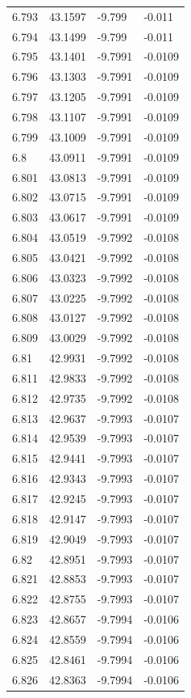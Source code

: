 \begin{tabular}{llll}
6.793 & 43.1597 & -9.799 & -0.011 \\
6.794 & 43.1499 & -9.799 & -0.011 \\
6.795 & 43.1401 & -9.7991 & -0.0109 \\
6.796 & 43.1303 & -9.7991 & -0.0109 \\
6.797 & 43.1205 & -9.7991 & -0.0109 \\
6.798 & 43.1107 & -9.7991 & -0.0109 \\
6.799 & 43.1009 & -9.7991 & -0.0109 \\
6.8 & 43.0911 & -9.7991 & -0.0109 \\
6.801 & 43.0813 & -9.7991 & -0.0109 \\
6.802 & 43.0715 & -9.7991 & -0.0109 \\
6.803 & 43.0617 & -9.7991 & -0.0109 \\
6.804 & 43.0519 & -9.7992 & -0.0108 \\
6.805 & 43.0421 & -9.7992 & -0.0108 \\
6.806 & 43.0323 & -9.7992 & -0.0108 \\
6.807 & 43.0225 & -9.7992 & -0.0108 \\
6.808 & 43.0127 & -9.7992 & -0.0108 \\
6.809 & 43.0029 & -9.7992 & -0.0108 \\
6.81 & 42.9931 & -9.7992 & -0.0108 \\
6.811 & 42.9833 & -9.7992 & -0.0108 \\
6.812 & 42.9735 & -9.7992 & -0.0108 \\
6.813 & 42.9637 & -9.7993 & -0.0107 \\
6.814 & 42.9539 & -9.7993 & -0.0107 \\
6.815 & 42.9441 & -9.7993 & -0.0107 \\
6.816 & 42.9343 & -9.7993 & -0.0107 \\
6.817 & 42.9245 & -9.7993 & -0.0107 \\
6.818 & 42.9147 & -9.7993 & -0.0107 \\
6.819 & 42.9049 & -9.7993 & -0.0107 \\
6.82 & 42.8951 & -9.7993 & -0.0107 \\
6.821 & 42.8853 & -9.7993 & -0.0107 \\
6.822 & 42.8755 & -9.7993 & -0.0107 \\
6.823 & 42.8657 & -9.7994 & -0.0106 \\
6.824 & 42.8559 & -9.7994 & -0.0106 \\
6.825 & 42.8461 & -9.7994 & -0.0106 \\
6.826 & 42.8363 & -9.7994 & -0.0106 \\

\end{tabular}
